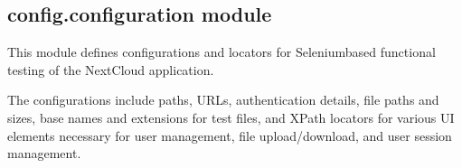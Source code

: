 \documentclass[letterpaper,10pt,english]{sphinxmanual}
\begin{document}
\subsection{config.configuration module}
\label{\detokenize{config:module-config.configuration}}\label{\detokenize{config:config-configuration-module}}
\sphinxAtStartPar
This module defines configurations and locators for Selenium\sphinxhyphen{}based functional testing of the NextCloud application.

\sphinxAtStartPar
The configurations include paths, URLs, authentication details, file paths and sizes, base names and extensions for test files,
and XPath locators for various UI elements necessary for user management, file upload/download, and user session management.
\end{document}
